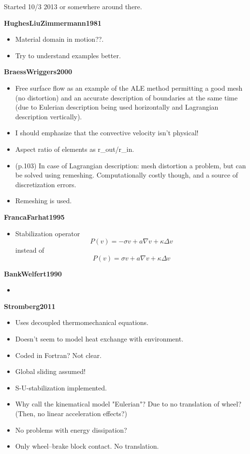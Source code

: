 \documentclass{article}
\begin{document}
Started 10/3 2013 or somewhere around there.


\textbf{HughesLiuZimmermann1981}
\begin{itemize}
\item Material domain in motion??.
\item Try to understand examples better.
\end{itemize}

\textbf{BraessWriggers2000}
\begin{itemize}
\item Free surface flow as an example of the ALE method permitting a good mesh (no distortion) and an accurate description of boundaries at the same time (due to Eulerian description being used horizontally and Lagrangian description vertically).
\item I should emphasize that the convective velocity isn't physical!
\item Aspect ratio of elements as r\_out/r\_in.
\item (p.103) In case of Lagrangian description: mesh distortion a problem, but can be solved using remeshing. Computationally costly though, and a source of discretization errors.
\item Remeshing is used.
\end{itemize}

\textbf{FrancaFarhat1995}
\begin{itemize}
\item Stabilization operator
\[P(v) = -\sigma v + a\nabla v + \kappa\Delta v\]
instead of
\[P(v) = \sigma v + a\nabla v + \kappa\Delta v\]
\end{itemize}

\textbf{BankWelfert1990}
\begin{itemize}
\item 
\end{itemize}

\textbf{Stromberg2011}
\begin{itemize}
\item Uses decoupled thermomechanical equations.
\item Doesn't seem to model heat exchange with environment.
\item Coded in Fortran? Not clear.
\item Global sliding assumed!
\item S-U-stabilization implemented.
\item Why call the kinematical model "Eulerian"? Due to no translation of wheel? (Then, no linear acceleration effects?)
\item No problems with energy dissipation?
\item Only wheel--brake block contact. No translation.
\end{itemize}
\end{document}
